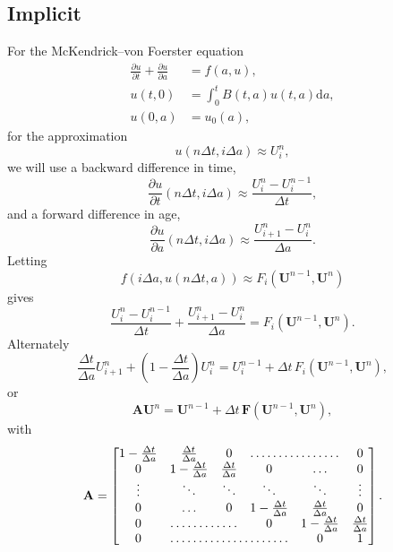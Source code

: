 \documentclass{article}
\renewcommand{\vec}[1]{\mathbf{#1}}
\newcommand{\mat}[1]{\mathbf{#1}}
\newcommand{\md}{\mathrm{d}}
\begin{document}
\subsection{Implicit}

For the McKendrick--von Foerster equation
\begin{equation}
  \begin{split}
    \frac{\partial u}{\partial t} + \frac{\partial u}{\partial a}
    &= f(a, u),
    \\
    u(t, 0) &= \int_0^t B(t, a) u(t, a) \md a,
    \\
    u(0, a) &= u_0(a),
  \end{split}
\end{equation}
for the approximation
\begin{equation}
  u(n \Delta t, i \Delta a) \approx U_i^n,
\end{equation}
we will use a backward difference in time,
\begin{equation}
  \frac{\partial u}{\partial t} (n \Delta t, i \Delta a)
  \approx
  \frac{U^n_i - U^{n - 1}_i}{\Delta t},
\end{equation}
and a forward difference in age,
\begin{equation}
  \frac{\partial u}{\partial a} (n \Delta t, i \Delta a)
  \approx
  \frac{U^n_{i + 1} - U^n_i}{\Delta a}.
\end{equation}
Letting
\begin{equation}
  f\left(i \Delta a, u(n \Delta t, a)\right)
  \approx F_i(\vec{U}^{n - 1}, \vec{U}^n)
\end{equation}
gives
\begin{equation}
  \frac{U^n_i - U^{n - 1}_i}{\Delta t}
  +
  \frac{U^n_{i + 1} - U^n_i}{\Delta a}
  = F_i(\vec{U}^{n - 1}, \vec{U}^n).
\end{equation}
Alternately
\begin{equation}
  \frac{\Delta t}{\Delta a} U^n_{i + 1}
  +
  \left(1 - \frac{\Delta t}{\Delta a}\right)
  U^n_i
  =
  U^{n - 1}_i + \Delta t \, F_i(\vec{U}^{n - 1}, \vec{U}^n),
\end{equation}
or
\begin{equation}
  \mat{A} \vec{U}^n
  =
  \vec{U}^{n - 1} + \Delta t \, \vec{F}(\vec{U}^{n - 1}, \vec{U}^n),
\end{equation}
with
\begin{equation}
  \mat{A} =
  \begin{bmatrix}
    1 - \frac{\Delta t}{\Delta a} & \frac{\Delta t}{\Delta a} & 0
    & \hdotsfor{2} & 0
    \\
    0 & 1 - \frac{\Delta t}{\Delta a} & \frac{\Delta t}{\Delta a}
    & 0 & \hdots & 0
    \\
    \vdots & \ddots & \ddots & \ddots & \ddots & \vdots
    \\
    0 & \hdots & 0 & 1 - \frac{\Delta t}{\Delta a} &
    \frac{\Delta t}{\Delta a} & 0
    \\
    0 & \hdotsfor{2} & 0 & 1 - \frac{\Delta t}{\Delta a} & \frac{\Delta t}{\Delta a}
    \\
    0 & \hdotsfor{3} & 0 & 1
  \end{bmatrix}.
\end{equation}
\end{document}
